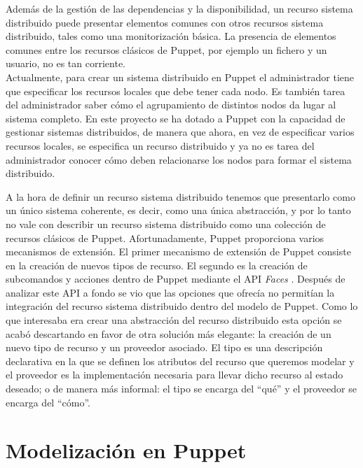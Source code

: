 Además de la gestión de las dependencias y la disponibilidad, un recurso sistema distribuido puede presentar elementos comunes con otros recursos sistema distribuido, tales como una monitorización básica. La presencia de elementos comunes entre los recursos clásicos de Puppet, por ejemplo un fichero y un usuario, no es tan corriente. \\

Actualmente, para crear un sistema distribuido en Puppet el administrador tiene que especificar los recursos locales que debe tener cada nodo. Es también tarea del administrador saber cómo el agrupamiento de distintos nodos da lugar al sistema completo. En este proyecto se ha dotado a Puppet con la capacidad de gestionar sistemas distribuidos, de manera que ahora, en vez de especificar varios recursos locales, se especifica un recurso distribuido y ya no es tarea del administrador conocer cómo deben relacionarse los nodos para formar el sistema distribuido.

A la hora de definir un recurso sistema distribuido tenemos que presentarlo como un único sistema coherente, es decir, como una única abstracción, y por lo tanto no vale con describir un recurso sistema distribuido como una colección de recursos clásicos de Puppet. Afortunadamente, Puppet proporciona varios mecanismos de extensión. El primer mecanismo de extensión de Puppet consiste en la creación de nuevos tipos de recurso. El segundo es la creación de subcomandos y acciones dentro de Puppet mediante el API \emph{Faces} \cite{puppet-faces}. Después de analizar este API a fondo se vio que las opciones que ofrecía no permitían la integración del recurso sistema distribuido dentro del modelo de Puppet. Como lo que interesaba era crear una abstracción del recurso distribuido esta opción se acabó descartando en favor de otra solución más elegante: la creación de un nuevo tipo de recurso y un proveedor asociado. El tipo es una descripción declarativa en la que se definen los atributos del recurso que queremos modelar y el proveedor es la implementación necesaria para llevar dicho recurso al estado deseado; o de manera más informal: el tipo se encarga del ``qué'' y el proveedor se encarga del ``cómo''.


\section{Modelización en Puppet}
\label{sec:modelado-puppet}



